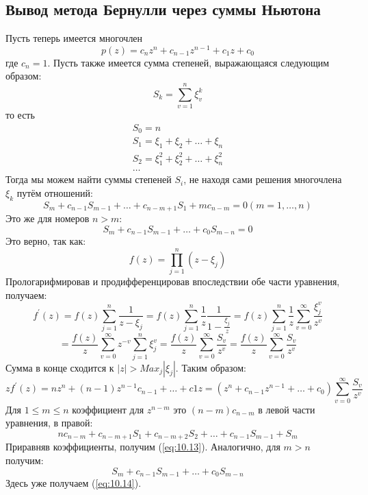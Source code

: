 \documentclass[a4paper,12pt]{article}
\begin{document}
\subsection{Вывод метода Бернулли через суммы Ньютона}
Пусть теперь имеется многочлен 
\begin{equation}
    p(z)=c_nz^n+c_{n-1}z^{n-1}+c_1z+c_0
\end{equation}
где $c_n=1$. Пусть также имеется сумма степеней, выражающаяся следующим образом:
\begin{equation}
    S_k=\sum_{v=1}^{n} \xi_{v}^{k}
\end{equation}
то есть 
\begin{align}
    S_0=n \\
    S_1=\xi_1+\xi_2+\dots+\xi_n \\
    S_2=\xi_1^2+\xi_2^2+\dots+\xi_n^2 \\
    \dots
    \label{eq:test}
\end{align}
Тогда мы можем найти суммы степеней $S_i$, не находя сами решения многочлена $\xi_k$ путём отношений:
\begin{equation}
    S_m+c_{n-1}S_{m-1}+\dots+c_{n-m+1}S_1+mc_{n-m}=0 (m=1,\dots,n)
    \label{eq:10.13}
\end{equation}
Это же для номеров $n>m$:
\begin{equation}
    S_m+c_{n-1}S_{m-1}+\dots+c_{0}S_{m-n}=0
    \label{eq:10.14}
\end{equation}
Это верно, так как:
\begin{equation}
    f(z)=\prod_{j=1}^{n}(z-\xi_j)
\end{equation}
Прологарифмировав и продифференцировав впоследствии обе части уравнения, получаем:
\begin{equation}
    f^{'}(z)=f(z)\sum_{j=1}^{n}\frac{1}{z-\xi_j}=f(z)\sum_{j=1}^{n}\frac{1}{z}\frac{1}{1-\frac{\xi_j}{z}}=f(z)\sum_{j=1}^{n}\frac{1}{z}\sum_{v=0}^{\infty} \frac{\xi_j^v}{z^v}
\end{equation}
\begin{equation}
    =\frac{f(z)}{z}\sum_{v=0}^{\infty} z^{-v} \sum_{j=1}^{n}\xi_j^v=\frac{f(z)}{z}\sum_{v=0}^{\infty} \frac{S_v}{z^v}=\frac{f(z)}{z}\sum_{v=0}^{\infty} \frac{S_v}{z^v}
\end{equation}
Сумма в конце сходится к $|z|>Max_j|\xi_j|$. Таким образом:
\begin{equation}
    zf^{'}(z)=nz^n+(n-1)z^{n-1}c_{n-1}+\dots+c1z=(z^n+c_{n-1}z^{n-1}+\dots+c_0)\sum_{v=0}^{\infty} \frac{S_v}{z^v}
\end{equation}
Для $1 \leq m \leq n$ коэффициент для $z^{n-m}$ это $(n-m)c_{n-m}$ в левой части уравнения, в правой:
\begin{equation}
    nc_{n-m}+c_{n-m+1}S_1+c_{n-m+2}S_2+\dots+c_{n-1}S_{m-1}+S_m
\end{equation}
Приравняв коэффициенты, получим (\ref{eq:10.13}). Аналогично, для $m>n$ получим:
\begin{equation}
    S_m+c_{n-1}S_{m-1}+\dots+c_0S_{m-n}
\end{equation}
Здесь уже получаем (\ref{eq:10.14}).
\end{document}

